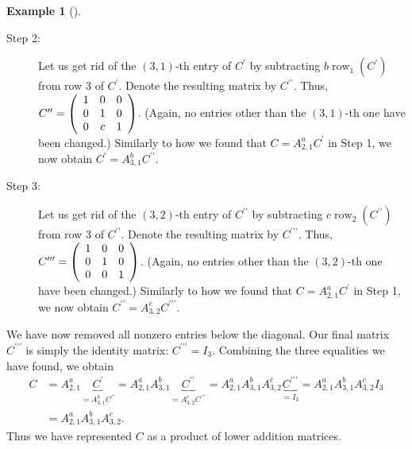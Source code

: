 \documentclass[numbers=enddot,12pt,final,onecolumn,notitlepage]{scrartcl}%
\theoremstyle{definition}
\newtheorem{exam}[theo]{Example}
\newenvironment{example}[1][]
{\begin{exam}[#1]\begin{leftbar}}
{\end{leftbar}\end{exam}}
\begin{document}
\begin{example}
\begin{description}
\item[Step 2:] Let us get rid of the $\left(  3,1\right)  $-th entry of
$C^{\prime}$ by subtracting $b\operatorname*{row}\nolimits_{1}\left(
C^{\prime}\right)  $ from row $3$ of $C^{\prime}$. Denote the resulting matrix
by $C^{\prime\prime}$. Thus, $C^{\prime\prime}=\left(
\begin{array}
[c]{ccc}%
1 & 0 & 0\\
0 & 1 & 0\\
0 & c & 1
\end{array}
\right)  $. (Again, no entries other than the $\left(  3,1\right)  $-th one
have been changed.) Similarly to how we found that $C=A_{2,1}^{a}C^{\prime}$
in Step 1, we now obtain $C^{\prime}=A_{3,1}^{b}C^{\prime\prime}$.

\item[Step 3:] Let us get rid of the $\left(  3,2\right)  $-th entry of
$C^{\prime\prime}$ by subtracting $c\operatorname*{row}\nolimits_{2}\left(
C^{\prime\prime}\right)  $ from row $3$ of $C^{\prime\prime}$. Denote the
resulting matrix by $C^{\prime\prime\prime}$. Thus, $C^{\prime\prime\prime
}=\left(
\begin{array}
[c]{ccc}%
1 & 0 & 0\\
0 & 1 & 0\\
0 & 0 & 1
\end{array}
\right)  $. (Again, no entries other than the $\left(  3,2\right)  $-th one
have been changed.) Similarly to how we found that $C=A_{2,1}^{a}C^{\prime}$
in Step 1, we now obtain $C^{\prime\prime}=A_{3,2}^{c}C^{\prime\prime\prime}$.
\end{description}

We have now removed all nonzero entries below the diagonal. Our final matrix
$C^{\prime\prime\prime}$ is simply the identity matrix: $C^{\prime\prime
\prime}=I_{3}$. Combining the three equalities we have found, we obtain%
\begin{align}
C  &  =A_{2,1}^{a}\underbrace{C^{\prime}}_{=A_{3,1}^{b}C^{\prime\prime}%
}=A_{2,1}^{a}A_{3,1}^{b}\underbrace{C^{\prime\prime}}_{=A_{3,2}^{c}%
C^{\prime\prime\prime}}=A_{2,1}^{a}A_{3,1}^{b}A_{3,2}^{c}\underbrace{C^{\prime
\prime\prime}}_{=I_{3}}=A_{2,1}^{a}A_{3,1}^{b}A_{3,2}^{c}I_{3}\nonumber\\
&  =A_{2,1}^{a}A_{3,1}^{b}A_{3,2}^{c}.
\label{eq.exam.thm.triangular.Alamuv.c.3}%
\end{align}
Thus we have represented $C$ as a product of lower addition matrices.


\end{example}
\end{document}
